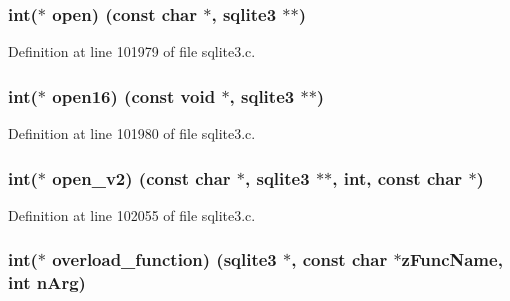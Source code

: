 \subsubsection[{open}]{\setlength{\rightskip}{0pt plus 5cm}int($\ast$ open) (const char $\ast$, {\bf sqlite3} $\ast$$\ast$)}\label{structsqlite3__api__routines_a9a5afaf1d25c526dda2af954066ff30a}


Definition at line 101979 of file sqlite3.\+c.

\hypertarget{structsqlite3__api__routines_af9495065c5993f238d091cfc80c4fe60}{}
\subsubsection[{open16}]{\setlength{\rightskip}{0pt plus 5cm}int($\ast$ open16) (const void $\ast$, {\bf sqlite3} $\ast$$\ast$)}\label{structsqlite3__api__routines_af9495065c5993f238d091cfc80c4fe60}


Definition at line 101980 of file sqlite3.\+c.

\hypertarget{structsqlite3__api__routines_a64695f272360a807813ba8d1af0291aa}{}
\subsubsection[{open\+\_\+v2}]{\setlength{\rightskip}{0pt plus 5cm}int($\ast$ open\+\_\+v2) (const char $\ast$, {\bf sqlite3} $\ast$$\ast$, int, const char $\ast$)}\label{structsqlite3__api__routines_a64695f272360a807813ba8d1af0291aa}


Definition at line 102055 of file sqlite3.\+c.

\hypertarget{structsqlite3__api__routines_a51cace8e3c8a535241634eb9788ccafc}{}
\subsubsection[{overload\+\_\+function}]{\setlength{\rightskip}{0pt plus 5cm}int($\ast$ overload\+\_\+function) ({\bf sqlite3} $\ast$, const char $\ast$z\+Func\+Name, int n\+Arg)}\label{structsqlite3__api__routines_a51cace8e3c8a535241634eb9788ccafc}


